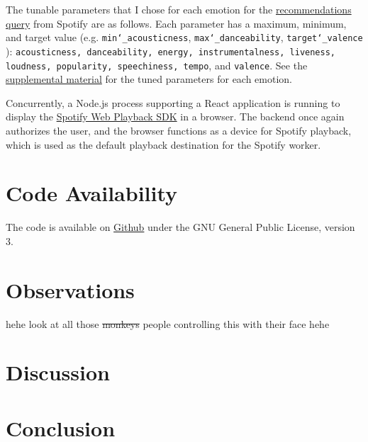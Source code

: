 \documentclass{article}
\renewcommand{\_}[1]{\underline{ #1 }}
\theoremstyle{definition}
\begin{document}
The tunable parameters that I chose for each emotion for the \href{https://developer.spotify.com/documentation/web-api/reference/#/operations/get-recommendationsrecommendation}{recommendations query} from Spotify are as follows. Each parameter has a maximum, minimum, and target value (e.g. \texttt{min\char`_acousticness}, \texttt{max\char`_danceability}, \texttt{target\char`_valence} ): \texttt{acousticness, danceability, energy, instrumentalness, liveness, loudness, popularity, speechiness, tempo}, and \texttt{valence}. See the \hyperref[subsec:params]{supplemental material} for the tuned parameters for each emotion.

Concurrently, a Node.js process supporting a React application is running to display the \href{https://developer.spotify.com/documentation/web-playback-sdk/}{Spotify Web Playback SDK} in a browser. The backend once again authorizes the user, and the browser functions as a device for Spotify playback, which is used as the default playback destination for the Spotify worker. 

\section[sec:code_availability]{Code Availability}

The code is available on \href{https://github.com/as4mo3/face-the-music/}{Github} under the GNU General Public License, version 3. 

\section[sec:observations]{Observations}
\label{observations}

hehe look at all those \sout{monkeys} people controlling this with their face hehe

\section[sec:discussion]{Discussion}
\label{discussion}

\section[sec:conclusion]{Conclusion}
\label{conclusion}

\end{document}
